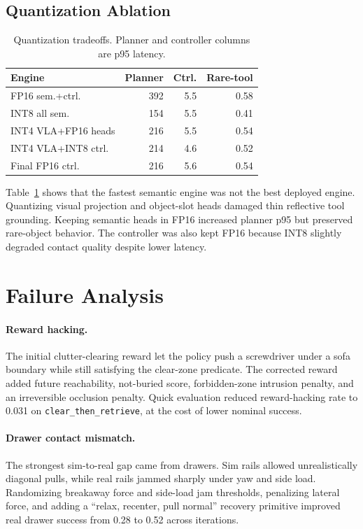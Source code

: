 \documentclass[10pt,twocolumn]{article}
\begin{document}
\subsection{Quantization Ablation}

\begin{table}[t]
\centering
\caption{Quantization tradeoffs. Planner and controller columns are p95 latency.}
\label{tab:quant}
\footnotesize
\begin{tabular}{@{}lrrr@{}}
\toprule
Engine & Planner & Ctrl. & Rare-tool \\
\midrule
FP16 sem.+ctrl. & 392 & 5.5 & 0.58 \\
INT8 all sem. & 154 & 5.5 & 0.41 \\
INT4 VLA+FP16 heads & 216 & 5.5 & 0.54 \\
INT4 VLA+INT8 ctrl. & 214 & 4.6 & 0.52 \\
Final FP16 ctrl. & 216 & 5.6 & 0.54 \\
\bottomrule
\end{tabular}
\end{table}

Table~\ref{tab:quant} shows that the fastest semantic engine was not the best deployed engine. Quantizing visual projection and object-slot heads damaged thin reflective tool grounding. Keeping semantic heads in FP16 increased planner p95 but preserved rare-object behavior. The controller was also kept FP16 because INT8 slightly degraded contact quality despite lower latency.

\section{Failure Analysis}

\paragraph{Reward hacking.}
The initial clutter-clearing reward let the policy push a screwdriver under a sofa boundary while still satisfying the clear-zone predicate. The corrected reward added future reachability, not-buried score, forbidden-zone intrusion penalty, and an irreversible occlusion penalty. Quick evaluation reduced reward-hacking rate to 0.031 on \texttt{clear\_then\_retrieve}, at the cost of lower nominal success.

\paragraph{Drawer contact mismatch.}
The strongest sim-to-real gap came from drawers. Sim rails allowed unrealistically diagonal pulls, while real rails jammed sharply under yaw and side load. Randomizing breakaway force and side-load jam thresholds, penalizing lateral force, and adding a ``relax, recenter, pull normal'' recovery primitive improved real drawer success from 0.28 to 0.52 across iterations.
\end{document}

